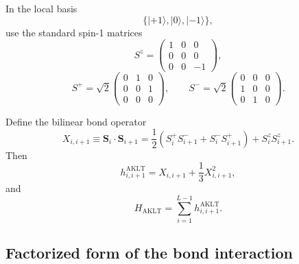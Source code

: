 \documentclass[aps,prb,onecolumn,nofootinbib]{revtex4-2}
\newcommand{\ket}[1]{|#1\rangle}
\begin{document}
	In the local basis
	\[
	\{\ket{+1},\ket{0},\ket{-1}\},
	\]
	use the standard spin-1 matrices
	\begin{equation}
		S^z
		=
		\begin{pmatrix}
			1 & 0 & 0 \\
			0 & 0 & 0 \\
			0 & 0 & -1
		\end{pmatrix},
	\end{equation}
	\begin{equation}
		S^+
		=
		\sqrt{2}
		\begin{pmatrix}
			0 & 1 & 0 \\
			0 & 0 & 1 \\
			0 & 0 & 0
		\end{pmatrix},
		\qquad
		S^-
		=
		\sqrt{2}
		\begin{pmatrix}
			0 & 0 & 0 \\
			1 & 0 & 0 \\
			0 & 1 & 0
		\end{pmatrix}.
	\end{equation}
	
	Define the bilinear bond operator
	\begin{equation}
		X_{i,i+1}
		\equiv
		\mathbf S_i\cdot \mathbf S_{i+1}
		=
		\frac12\left(S_i^+S_{i+1}^- + S_i^-S_{i+1}^+\right)
		+
		S_i^z S_{i+1}^z.
		\label{eq:aklt-bilinear-bond}
	\end{equation}
	Then
	\begin{equation}
		h_{i,i+1}^{\mathrm{AKLT}}
		=
		X_{i,i+1}
		+
		\frac13 X_{i,i+1}^2,
		\label{eq:aklt-local-bond}
	\end{equation}
	and
	\[
	H_{\mathrm{AKLT}} = \sum_{i=1}^{L-1} h_{i,i+1}^{\mathrm{AKLT}}.
	\]
	
	\subsection{Factorized form of the bond interaction}
	
\end{document}
